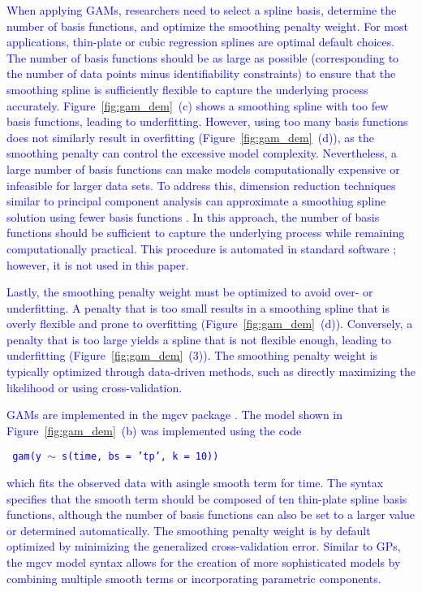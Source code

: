 \documentclass[man, floatsintext]{apa7}
\begin{document}
\textcolor{blue}{
  When applying GAMs, researchers need to select a spline basis, determine the
  number of basis functions, and optimize the smoothing penalty weight. For
  most applications, thin-plate or cubic regression splines are optimal default
  choices. The number of basis functions should be as large as possible
  (corresponding to the number of data points minus identifiability
  constraints) to ensure that the smoothing spline is sufficiently flexible to
  capture the underlying process accurately. Figure~\ref{fig:gam_dem}~(c) shows
  a smoothing spline with too few basis functions, leading to underfitting.
  However, using too many basis functions does not similarly result in
  overfitting (Figure~\ref{fig:gam_dem}~(d)), as the smoothing penalty can
  control the excessive model complexity. Nevertheless, a large number of basis
  functions can make models computationally expensive or infeasible for larger
  data sets. To address this, dimension reduction techniques similar to
  principal component analysis can approximate a smoothing spline solution
  using fewer basis functions \parencite{wood_thin_2003}. In this approach, the
  number of basis functions should be sufficient to capture the underlying
  process while remaining computationally practical. This procedure is
  automated in standard software \parencite{R-mgcv_a}; however, it is not used
  in this paper.}

\textcolor{blue}{
  Lastly, the smoothing penalty weight must be optimized to avoid over- or
  underfitting. A penalty that is too small results in a smoothing spline that
  is overly flexible and prone to overfitting (Figure~\ref{fig:gam_dem}~(d)).
  Conversely, a penalty that is too large yields a spline that is not flexible
  enough, leading to underfitting (Figure~\ref{fig:gam_dem}~(3)). The smoothing
  penalty weight is typically optimized through data-driven methods, such as
  directly maximizing the likelihood or using cross-validation.
}

\textcolor{blue}{ GAMs are implemented in the mgcv package
  \parencite{R-mgcv_a}. The model shown in Figure~\ref{fig:gam_dem}~(b) was
  implemented using the code}

\textcolor{blue}{\fontsize{10}{12}\selectfont\texttt{ gam(y $\sim$
    s(time, bs = 'tp', k = 10)) }}

\noindent\textcolor{blue}{which fits the observed data with asingle
  smooth term for time. The syntax specifies that the smooth term should be
  composed of ten thin-plate spline basis functions, although the number of
  basis functions can also be set to a larger value or determined
  automatically. The smoothing penalty weight is by default optimized
  by minimizing the generalized cross-validation error. Similar to GPs, the
  mgcv model syntax allows for the creation of more sophisticated models by
  combining multiple smooth terms or incorporating parametric components. }
\end{document}
